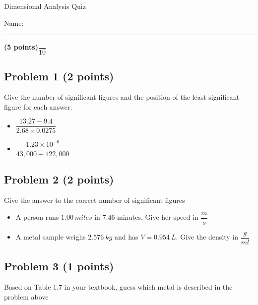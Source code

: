 \documentclass[12pt, letterpaper]{memoir}
\begin{document}
	\begin{center}
		{\large	Dimensional Analysis Quiz}
	\end{center}
	{\large Name: \rule[-1mm]{4in}{.1pt} {\bfseries (5 points)}\hspace{4em}$\dfrac{~}{10}$} 
	\subsection*{Problem 1 (2 points)}
	Give the number of significant figures and the position of the least significant figure for each answer:
	\begin{itemize}
		\item \vspace{2em} $\dfrac{13.27-9.4}{2.68\times0.0275}$
		\item \vspace{4em} $\dfrac{1.23\times10^{-6}}{43,000+122,000}$	
	\end{itemize}
	
	

	\vspace{3em}
	\subsection*{Problem 2 (2 points)}
	Give the answer to the correct number of significant figures
	\begin{itemize}
		\item \vspace{2em} A person runs $1.00~miles$ in $7.46$ minutes. Give her speed in $\dfrac{m}{s}$
		\item \vspace{3em} A metal sample weighs $2.576~kg$ and has $V=0.954~L$. Give the density in $\dfrac{g}{ml}$
	\end{itemize}
	
	\vspace{3em}
	\subsection*{Problem 3 (1 points)}
	Based on Table 1.7 in your textbook, guess which metal is described in the problem above
\end{document}
